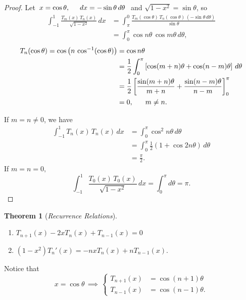 \documentclass[12pt,a4paper]{report}
\theoremstyle{definition}
\newtheorem{thm}{Theorem}[section]
\theoremstyle{plain}
\begin{document}
\begin{proof}
Let $\, x = \cos \theta, \hspace{0.5cm} dx  = -\sin \theta\, d\theta\,\,$ and $\sqrt{1 - x^2} = \sin \theta$, so 
\begin{align*}
\int_{-1}^1\frac{T_m(x)\, T_n(x)}{\sqrt{1 - x^2}}\, dx & = \int_{\pi}^0\frac{T_m(\cos \theta)\, T_n(\cos\theta)\, (-\sin\theta\, d\theta)}{\sin\theta}\\
& = \int^{\pi}_0\cos n\theta\, \cos m\theta \, d\theta,
\end{align*}
\begin{align*}
T_n(\cos \theta)   = \cos\left(n\, \cos^{-1}(\cos \theta)\right)
                 & = \cos n\theta\\
                 & = \frac{1}{2}\int_0^{\pi}\left[\cos (m+n)\theta + \cos (n-m)\theta\right]\, d\theta\\
                 & = \frac{1}{2}\left[\frac{\sin (m+n)\theta}{m+n} + \frac{\sin (n-m)\theta}{n-m}\right]^{\pi}_0\\
                 & = 0, \hspace{0.6cm} m\neq n.
\end{align*}

If $m = n \neq 0$, we have 
\begin{align*}
\int_{-1}^1T_n(x)\, T_n(x)\, dx & = \int_0^{\pi}\cos^2 n\theta \, d\theta\\
                                & = \int_0^{\pi}\frac{1}{2}(1 + \cos 2n\theta)\, d\theta\\
                                & = \frac{\pi}{2}.
\end{align*}
If $m = n = 0,$
$$\int^1_{-1}\frac{T_0(x)\, T_0(x)}{\sqrt{1 - x^2}}\, dx = \int^{\pi}_0 d\theta = \pi.$$
\end{proof}






\begin{thm}[\textit{Recurrence Relations}]\textbf{}
\vspace{-4mm}
\begin{enumerate}
\item[(a).] $T_{n+1}(x) - 2xT_n(x) + T_{n-1}(x) = 0$
\item[(b).] $(1 - x^2)T_n'(x) = -nxT_n(x) + nT_{n-1}(x).$\\
\end{enumerate}
\end{thm}


Notice that $$x = \cos \theta\, \implies\, \begin{cases}
                                            T_{n+1}(x) & = \cos (n+1)\theta\\
                                            T_{n-1}(x) & = \cos (n-1)\theta.
                                           \end{cases}$$
\end{document}
